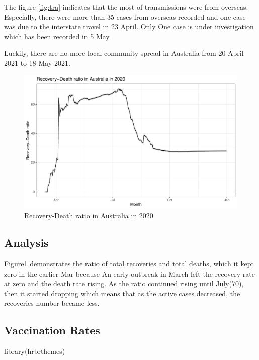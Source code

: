 \documentclass[11pt,a4paper,]{article}
\newenvironment{Shaded}{\begin{snugshade}}{\end{snugshade}}
\newcommand{\FunctionTok}[1]{\textcolor[rgb]{0.00,0.00,0.00}{#1}}
\newcommand{\NormalTok}[1]{#1}
\begin{document}
The figure \ref{fig:tra} indicates that the most of transmissions were from overseas. Especially, there were more than 35 cases from overseas recorded and one case was due to the interstate travel in 23 April. Only One case is under investigation which has been recorded in 5 May.

Luckily, there are no more local community spread in Australia from 20 April 2021 to 18 May 2021.

\begin{figure}
\centering
\includegraphics{report_files/figure-latex/figrec3-1.pdf}
\caption{\label{fig:figrec3}Recovery-Death ratio in Australia in 2020}
\end{figure}

\hypertarget{analysis-3}{%
\subsection{Analysis}\label{analysis-3}}

Figure\ref{fig:figrec3} demonstrates the ratio of total recoveries and total deaths, which it kept zero in the earlier Mar because An early outbreak in March left the recovery rate at zero and the death rate rising. As the ratio continued rising until July(70), then it started dropping which means that as the active cases decreased, the recoveries number became less.

\hypertarget{vaccination-rates}{%
\subsection{Vaccination Rates}\label{vaccination-rates}}

\begin{Shaded}
\begin{Highlighting}[]
\FunctionTok{library}\NormalTok{(hrbrthemes)}
\end{Highlighting}
\end{Shaded}
\end{document}
